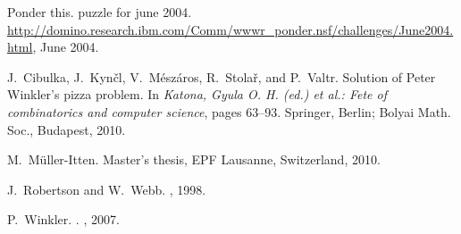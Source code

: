 \documentclass[11pt]{article}
\begin{document}

\begin{thebibliography}{1}

Ponder this. puzzle for june 2004.
\newblock
  \url{http://domino.research.ibm.com/Comm/wwwr_ponder.nsf/challenges/June2004.html}, June 2004.

J.~Cibulka, J.~Kyn\v{c}l, V.~M\'{e}sz\'{a}ros, R.~Stola\v{r}, and P.~Valtr.
\newblock Solution of {Peter Winkler's} pizza problem.
\newblock In {\em {Katona, Gyula O. H. (ed.) et al.: Fete of combinatorics and
  computer science}}, pages 63--93. Springer, Berlin; Bolyai Math. Soc.,
  Budapest, 2010.

M.~M{\"{u}}ller-Itten.
\newblock Master's thesis, EPF Lausanne, Switzerland, 2010.

J.~Robertson and W.~Webb.
, 1998.

P.~Winkler.
.
, 2007.

\end{thebibliography}
\end{document}
